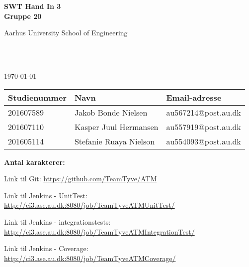 \begin{center}
	{\fontsize{36pt}{0}\selectfont
		\textbf{
		SWT Hand In 3\\
		Gruppe 20\\
		}
	}
	\vspace{20pt}

	{\fontsize{14pt}{0}\selectfont
		Aarhus University School of Engineering\\
	}
	\vspace{20pt}

	{\fontsize{24pt}{0}\selectfont
		\thetitle\\
	}
	\vspace{20pt}

	{\fontsize{18pt}{0}\selectfont
		\ifdefined\frontpageDate
			\frontpageDate\\
		\else
			\today\\
		\fi
	}
	\vspace{20pt}

	\vspace{5pt}
	\begin{tabular}{|l|l|l|}
		\hline
		\rowcolor{gray!50}
		\textbf{Studienummer} & \textbf{Navn} & \textbf{Email-adresse} \\ [5px]
		\hline
		201607589 & Jakob Bonde Nielsen & au567214@post.au.dk\\
		\hline
		201607110 & Kasper Juul Hermansen & au557919@post.au.dk\\
		\hline
		201605114 & Stefanie Ruaya Nielson & au554093@post.au.dk\\
		\hline
	\end{tabular}


	\ifdefined\frontpageCharacters
		\vspace{10pt}
		\textbf{Antal karakterer: } \frontpageCharacters\\
	\fi
	\vspace{30pt}

\end{center}

Link til Git: \url{https://github.com/TeamTyve/ATM} \newline

Link til Jenkins - UnitTest: \url{http://ci3.ase.au.dk:8080/job/TeamTyveATMUnitTest/} \newline

Link til Jenkins - integrationstests: \url{http://ci3.ase.au.dk:8080/job/TeamTyveATMIntegrationTest/} \newline 

Link til Jenkins - Coverage: \url{http://ci3.ase.au.dk:8080/job/TeamTyveATMCoverage/} 


